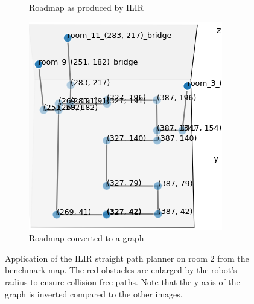 \begin{figure}[h]
\begin{subfigure}{.25\textwidth}
      \caption{Roadmap as produced by ILIR}
    \end{subfigure}%
    \begin{subfigure}{.25\textwidth}
      \centering
      \includegraphics[width=\textwidth]{figures/50_implementation/ryu_room2_roadmap_graph.png}
      \caption{Roadmap converted to a graph}
    \end{subfigure}
    \caption[Application of the ILIR straight path planner on room 2 from the benchmark map]{Application of the ILIR straight path planner on room 2 from the benchmark map. The red obstacles are enlarged by the robot's radius to ensure collision-free paths. Note that the y-axis of the graph is inverted compared to the other images.}
    \label{fig:ilir_room_roadmap}
\end{figure}

